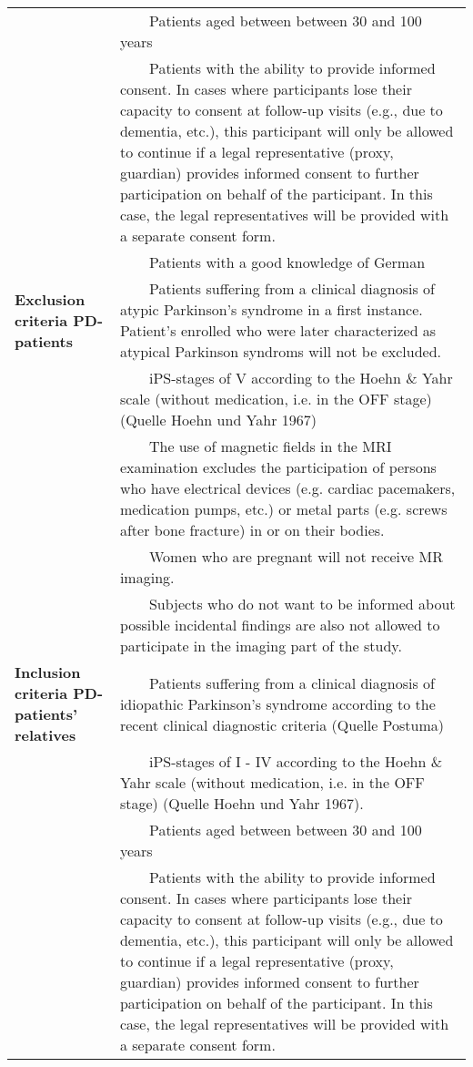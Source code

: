 \documentclass[
	a4paper, 
	11.5pt,
	headings=small, 
	twoside, 
	titlepage=firstiscover, 
 	pagesize=auto,
  	version=last,
	open=any,
	BCOR=14mm,
  	chapterprefix=false]{scrbook}
\newcommand{\tabitem}{~~\llap{\textbullet}~~}
\begin{document}
\begin{tabularx}{1\textwidth}{m{3.5cm} | X}
& \tabitem{Patients aged between between 30 and 100 years} \\
							& \tabitem{Patients with the ability to provide informed consent. In cases where participants lose their capacity to consent at follow-up visits (e.g., due to dementia, etc.), this participant will only be allowed to continue if a legal representative (proxy, guardian) provides informed consent to further participation on behalf of the participant. In this case, the legal representatives will be provided with a separate consent form.} \\
							& \tabitem{Patients with a good knowledge of German} \\
\midrule
\textbf{Exclusion criteria \ac{PD}-patients}& \tabitem{Patients suffering from a clinical diagnosis of atypic Parkinson's syndrome in a first instance. Patient's enrolled who were later characterized as atypical Parkinson syndroms will not be excluded.}\\
							& \tabitem{\ac{iPS}-stages of V according to the Hoehn \& Yahr scale (without medication, i.e. in the OFF stage) (Quelle Hoehn und Yahr 1967)}\\
							& \tabitem{The use of magnetic fields in the MRI examination excludes the participation of persons who have electrical devices (e.g. cardiac pacemakers, medication pumps, etc.) or metal parts (e.g. screws after bone fracture) in or on their bodies.}\\
							& \tabitem{Women who are pregnant will not receive MR imaging.}\\
							& \tabitem{Subjects who do not want to be informed about possible incidental findings are also not allowed to participate in the imaging part of the study.}\\
\midrule
\textbf{Inclusion criteria \ac{PD}-patients' relatives}& \tabitem{Patients suffering from a clinical diagnosis of idiopathic Parkinson's syndrome according to the recent clinical diagnostic criteria (Quelle Postuma)} \\
							& \tabitem{\ac{iPS}-stages of I - IV according to the Hoehn \& Yahr scale (without medication, i.e. in the OFF stage) (Quelle Hoehn und Yahr 1967).} \\
& \tabitem{Patients aged between between 30 and 100 years} \\
							& \tabitem{Patients with the ability to provide informed consent. In cases where participants lose their capacity to consent at follow-up visits (e.g., due to dementia, etc.), this participant will only be allowed to continue if a legal representative (proxy, guardian) provides informed consent to further participation on behalf of the participant. In this case, the legal representatives will be provided with a separate consent form.} \\

\end{tabularx}
\end{document}
